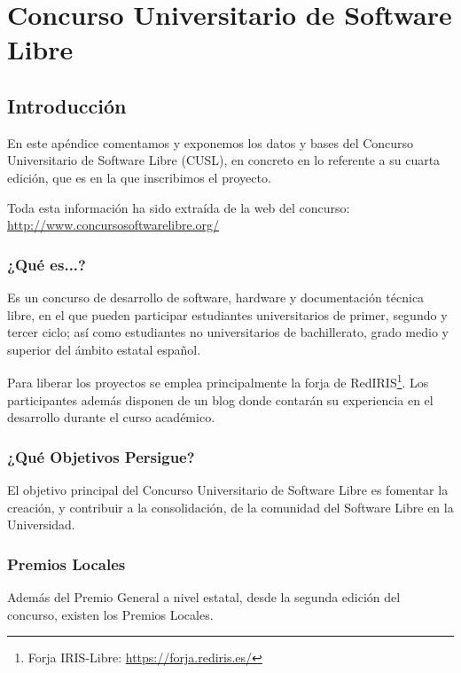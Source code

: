\chapter{Concurso Universitario de Software Libre} \label{ap2}

\vspace*{5mm}

\section{Introducción}

En este apéndice comentamos y exponemos los datos y bases del Concurso
Universitario de Software Libre (CUSL), en concreto en lo referente a su cuarta
edición, que es en la que inscribimos el proyecto.

Toda esta información ha sido extraída de la web del concurso:
\url{http://www.concursosoftwarelibre.org/}

\subsection{¿Qué es...?}

Es un concurso de desarrollo de software, hardware y documentación técnica
libre, en el que pueden participar estudiantes universitarios de primer,
segundo y tercer ciclo; así como estudiantes no universitarios de bachillerato,
grado medio y superior del ámbito estatal español.

Para liberar los proyectos se emplea principalmente la forja de
RedIRIS\footnote{Forja IRIS-Libre: \url{https://forja.rediris.es/}}. Los
participantes además disponen de un blog donde contarán su experiencia en el
desarrollo durante el curso académico.

\subsection{¿Qué Objetivos Persigue?}

El objetivo principal del Concurso Universitario de Software Libre es fomentar
la creación, y contribuir a la consolidación, de la comunidad del Software Libre
en la Universidad.

\subsection{Premios Locales}

Además del Premio General a nivel estatal, desde la segunda edición del
concurso, existen los Premios Locales.

